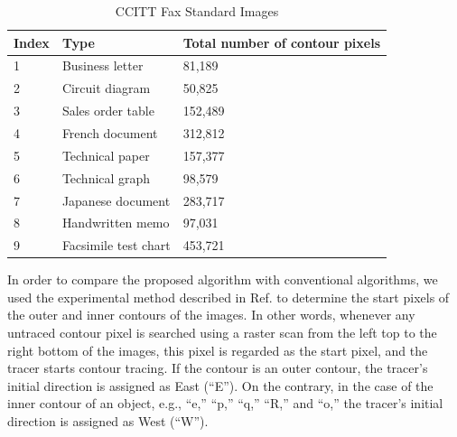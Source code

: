 \begin{table}[h]
	\centering
	\begin{tabularx}{1.0\textwidth}{C{3cm}YY}
		\toprule
		Index & Type & Total number of contour pixels \\
		 & Business letter & 81,189 \\
		2 & Circuit diagram & 50,825 \\
		3 & Sales order table & 152,489 \\
		4 & French document & 312,812 \\
		5 & Technical paper & 157,377 \\
		6 & Technical graph & 98,579 \\
		7 & Japanese document & 283,717 \\
		8 & Handwritten memo & 97,031 \\
		9 & Facsimile test chart & 453,721 \\
		\bottomrule
	\end{tabularx}
	\caption{CCITT Fax Standard Images}
	\label{table:ccitt}
\end{table}	


In order to compare the proposed algorithm with conventional algorithms, we used the experimental method described in Ref. \cite{Danielsson1981Improvement} to determine the start pixels of the outer and inner contours of the images. In other words, whenever any untraced contour pixel is searched using a raster scan from the left top to the right bottom of the images, this pixel is regarded as the start pixel, and the tracer starts contour tracing. If the contour is an outer contour, the tracer's initial direction is assigned as East (``E''). On the contrary, in the case of the inner contour of an object, e.g., ``e,'' ``p,'' ``q,'' ``R,'' and ``o,'' the tracer's initial direction is assigned as West (``W''). 

